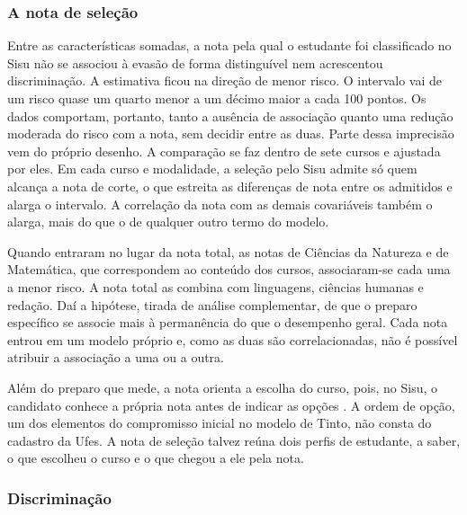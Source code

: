 \documentclass[12pt,a4paper]{article}
\begin{document}
\subsubsection{A nota de seleção}
\label{sec:disc-nota}

Entre as características somadas, a nota pela qual o estudante foi classificado no Sisu não se associou à evasão de forma distinguível nem acrescentou discriminação. A estimativa ficou na direção de menor risco. O intervalo vai de um risco quase um quarto menor a um décimo maior a cada 100 pontos. Os dados comportam, portanto, tanto a ausência de associação quanto uma redução moderada do risco com a nota, sem decidir entre as duas. Parte dessa imprecisão vem do próprio desenho. A comparação se faz dentro de sete cursos e ajustada por eles. Em cada curso e modalidade, a seleção pelo Sisu admite só quem alcança a nota de corte, o que estreita as diferenças de nota entre os admitidos e alarga o intervalo. A correlação da nota com as demais covariáveis também o alarga, mais do que o de qualquer outro termo do modelo.

Quando entraram no lugar da nota total, as notas de Ciências da Natureza e de Matemática, que correspondem ao conteúdo dos cursos, associaram-se cada uma a menor risco. A nota total as combina com linguagens, ciências humanas e redação. Daí a hipótese, tirada de análise complementar, de que o preparo específico se associe mais à permanência do que o desempenho geral. Cada nota entrou em um modelo próprio e, como as duas são correlacionadas, não é possível atribuir a associação a uma ou a outra.

Além do preparo que mede, a nota orienta a escolha do curso, pois, no Sisu, o candidato conhece a própria nota antes de indicar as opções \citep{klitzkeFATORESASSOCIADOSEVASAO2023}. A ordem de opção, um dos elementos do compromisso inicial no modelo de Tinto, não consta do cadastro da Ufes. A nota de seleção talvez reúna dois perfis de estudante, a saber, o que escolheu o curso e o que chegou a ele pela nota.

\subsubsection{Discriminação}
\label{sec:disc-discriminacao}
\end{document}
